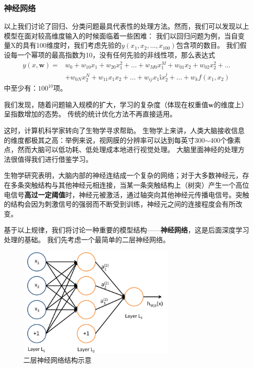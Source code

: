 \subsubsection{神经网络}
以上我们讨论了回归、分类问题最具代表性的处理方法。然而，我们可以发现以上模型在面对较高维度输入的时候面临着一些困难： 我们以回归问题为例，当自变量X的具有100维度时，我们考虑先验的$y(x_1, x_2, ..., x_100)$包含项的数目。 我们假设每一个幂项的最高指数为10，没有任何先验的非线性项，那么表达式
\begin{equation}
\begin{aligned}
y(x,\mathbf{w}) = & w_0 + w_{10} x_1 + w_{20} x_1^2 + ... + w_{M0} x_1^M + w_{01} x_2 + w_{02} x_2^2 + ... \\
& + w_{0N} x_2^N + w_{11} x_1 x_2 + ...+ w_{ij} x_1î x_2^j + ... + w_{k} f(x_1, x_2)
\end{aligned}
\end{equation}
中至少有：$100^{10}$项。 

我们发现，随着问题输入规模的扩大，学习的复杂度（体现在权重值$\mathbf{w}$的维度上）呈指数增加的态势。 传统的统计优化方法不再直接适用。

这时，计算机科学家转向了生物学寻求帮助。 生物学上来讲，人类大脑接收信息的维度都极其之高：举例来说，视网膜的分辨率可以达到每英寸300$\sim$400个像素点，然而大脑可以低功耗、低处理成本地进行视觉处理。 大脑里面神经的处理方法很值得我们进行借鉴学习。

生物学研究表明，大脑内部的神经连结成一个复杂的网络；对于大多数神经元，存在多条突触结构与其他神经元相连接，当某一条突触结构上（树突）产生一个高位电信号\textbf{高过一定阈值}时，神经元被激活，通过轴突向其他神经元传播电信号。突触的结构会因为刺激信号的强弱而不断受到训练，神经元之间的连接程度会有所改变。

基于以上规律，我们将讨论一种重要的模型结构——\textbf{神经网络}，这是后面深度学习处理的基础。 我们先考虑一个最简单的二层神经网络。
\begin{figure}[htbp]
   \centering
   \includegraphics[width=0.7\textwidth]{NeuralNetwork.png} %
   \caption{二层神经网络结构示意}
   \label{fig:neuralnetwork}
\end{figure}



